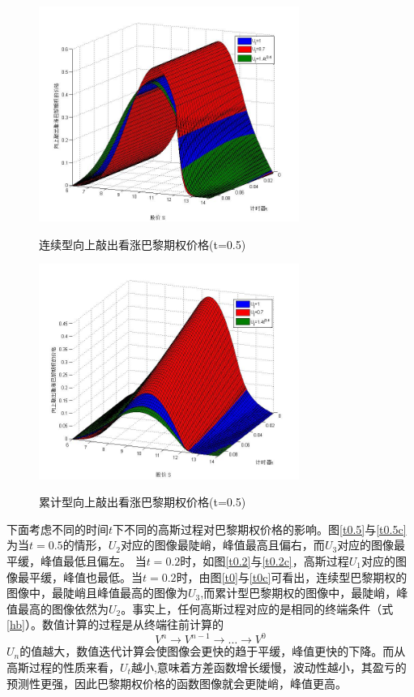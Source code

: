 \documentclass{ctexart} %
\begin{document}
\begin{figure}[H]
\label{mg2}
\begin{minipage}{0.48\linewidth}
\includegraphics[width=8.5cm]{code/mg2.jpg}
\caption{连续型向上敲出看涨巴黎期权价格(t=0.5)}
\end{minipage}
\begin{minipage}{0.48\linewidth}
\label{mc2}
\includegraphics[width=8.5cm]{code/mc2.jpg}
\caption{累计型向上敲出看涨巴黎期权价格(t=0.5)}
\end{minipage}
\end{figure}

下面考虑不同的时间$t$下不同的高斯过程对巴黎期权价格的影响。图\ref{t0.5}与\ref{t0.5c}为当$t=0.5$的情形，$U_2$对应的图像最陡峭，峰值最高且偏右，而$U_3$对应的图像最平缓，峰值最低且偏左。
当$t=0.2$时，如图\ref{t0.2}与\ref{t0.2c}，高斯过程$U_1$对应的图像最平缓，峰值也最低。当$t=0.2$时，由图\ref{t0}与\ref{t0c}可看出，连续型巴黎期权的图像中，最陡峭且峰值最高的图像为$U_3$,而累计型巴黎期权的图像中，最陡峭，峰值最高的图像依然为$U_2$。事实上，任何高斯过程对应的是相同的终端条件（式\eqref{hb}）。数值计算的过程是从终端往前计算的
$$V^n\rightarrow V^{n-1} \rightarrow \ldots \rightarrow V^0$$
$U_n$的值越大，数值迭代计算会使图像会更快的趋于平缓，峰值更快的下降。而从高斯过程的性质来看，$U_t$越小,意味着方差函数增长缓慢，波动性越小，其盈亏的预测性更强，因此巴黎期权价格的函数图像就会更陡峭，峰值更高。
\end{document}
